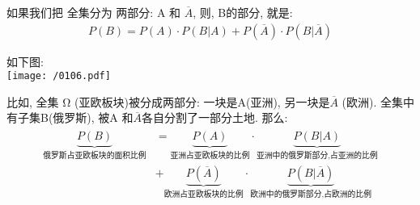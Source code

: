 \documentclass[UTF8]{ctexart}
\begin{document}
	如果我们把 全集分为 两部分: A 和 $ \overline{A}$, 则, B的部分, 就是: 
	\begin{align*}  %
\boxed{
	P(B)= P(A) \cdot P(B |A) +  P( \overline{A}) \cdot P(B | \overline{A})
}  
	\end{align*}

	如下图: \\
	\texttt{[image: /0106.pdf]}
	
	比如, 全集 Ω (亚欧板块)被分成两部分: 一块是A(亚洲), 另一块是$\overline{A}$ (欧洲). 全集中有子集B(俄罗斯), 被A 和$\overline{A}$各自分割了一部分土地. 那么: 
	\begin{align*}  %
\begin{matrix}
	\underset{\text{俄罗斯占亚欧板块的面积比例}}{\underbrace{P\left( B \right) }}
	&=\underset{\text{亚洲占亚欧板块的比例}}{\underbrace{P\left( A \right) }}\cdot \underset{\text{亚洲中的俄罗斯部分,占亚洲的比例}}{\underbrace{P\left( B|A \right) }}\\
	& +\underset{\text{欧洲占亚欧板块的比例}}{\underbrace{P\left( \overline{A} \right) }}\cdot \underset{\text{欧洲中的俄罗斯部分,占欧洲的比例}}{\underbrace{P\left( B|\overline{A} \right) }}\\
\end{matrix}
	\end{align*}
	
	
	
	
	
	
	
\end{document}

